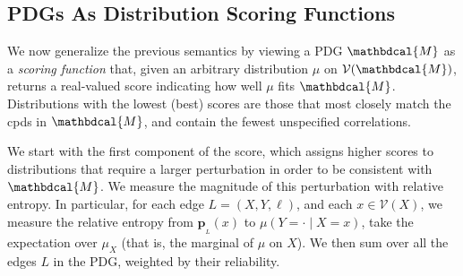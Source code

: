 \documentclass[letterpaper]{article} %
\theoremstyle{plain}
\theoremstyle{definition}
\theoremstyle{remark}
\newcommand\mat[1]{\mathbf{#1}}
\newcommand{\bp}[1][L]{\mat{p}_{\!_{#1}\!}}
\newcommand{\V}{\mathcal V}
\newcommand{\dg}[1]{\mathbdcal{#1}}
\begin{document}
\subsection{PDGs As Distribution Scoring Functions}
\label{sec:scoring-semantics}   
We now generalize the previous semantics by viewing a PDG $\dg M$ as
a \emph{scoring function} that, given an arbitrary distribution $\mu$ on $\V(\dg M)$, 
returns a real-valued score indicating how 
well
$\mu$ fits $\dg M$. Distributions with the lowest (best) scores are those that
most closely match the cpds in $\dg M$, and contain the fewest unspecified correlations.

We start with the first component
of the score,
which assigns higher scores to distributions that require a larger perturbation in order to be consistent with $\dg M$.  
We measure the magnitude of this perturbation with relative entropy. In particular, for each edge $L = (X,Y, \ell)$, and each $x \in \V(X)$, we measure the relative entropy from $\bp(x)$ to $\mu(Y \!= \cdot\mid X=x)$, take the expectation over $\mu_X$ (that is, the marginal of $\mu$ on $X$). We then sum over all the edges $L$ in the PDG, weighted by their reliability.
\end{document}
